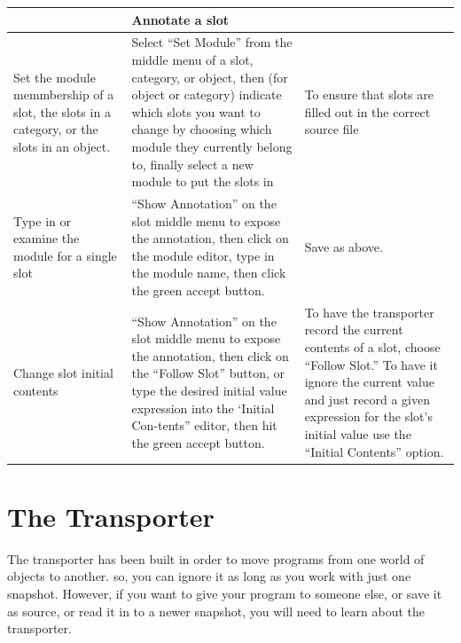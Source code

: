 \documentclass[letterpaper,10pt,english]{sphinxmanual}
\begin{document}
\begin{tabulary}{\linewidth}{p{5cm} p{5cm} p{5cm}}
\hline
 & 
\textbf{Annotate a slot}
 & \\\hline

Set the module memmbership of a slot, the slots in a
category, or the slots in an object.
 & 
Select “Set Module” from the middle menu of a slot, category, or object, then (for object or category) indicate which slots you want to change by choosing which module they currently belong to, finally select a
new module to put the slots in
 & 
To ensure that slots are filled out in the correct source file
\\\hline

Type in or examine the module for a single slot
 & 
“Show Annotation” on the slot middle menu to expose the annotation, then click on the module editor, type in the module name, then click the green accept button.
 & 
Save as above.
\\\hline

Change slot initial contents
 & 
“Show Annotation” on the slot middle menu to expose the annotation, then click on the “Follow Slot” button, or type the desired initial value expression into the ‘Initial Con-tents” editor, then hit the green accept button.
 & 
To have the transporter record the current contents of a slot, choose “Follow Slot.” To have it ignore the current value and just record a given expression for the slot’s initial value use the “Initial Contents” option.
\\\hline
\end{tabulary}



\section{The Transporter}
\label{howtoprg:the-transporter}
The transporter has been built in order to move programs from one world of objects to another. so,
you can ignore it as long as you work with just one snapshot. However, if you want to give your
program to someone else, or save it as source, or read it in to a newer snapshot, you will need to
learn about the transporter.
\end{document}
